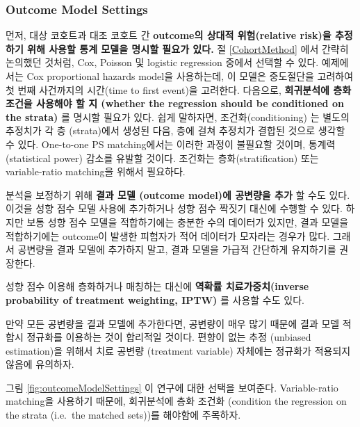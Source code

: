 \documentclass[11pt]{book}
\theoremstyle{definition}
\theoremstyle{definition}
\theoremstyle{definition}
\theoremstyle{remark}
\begin{document}
\subsubsection*{Outcome Model Settings}\label{outcome-model-settings}

먼저, 대상 코호트과 대조 코호트 간 \textbf{outcome의 상대적
위험(relative risk)을 추정하기 위해 사용할 통계 모델을 명시할 필요가
있다.} 절 \ref{CohortMethod} 에서 간략히 논의했던 것처럼, Cox, Poisson
및 logistic regression 중에서 선택할 수 있다. 예제에서는 Cox
proportional hazards model을 사용하는데, 이 모델은 중도절단을 고려하여
첫 번째 사건까지의 시간(time to first event)을 고려한다. 다음으로,
\textbf{회귀분석에 층화 조건을 사용해야 할 지 (whether the regression
should be conditioned on the strata)} 를 명시할 필요가 있다. 쉽게
말하자면, 조건화(conditioning) 는 별도의 추정치가 각 층 (strata)에서
생성된 다음, 층에 걸쳐 추정치가 결합된 것으로 생각할 수 있다. One-to-one
PS matching에서는 이러한 과정이 불필요할 것이며, 통계력 (statistical
power) 감소를 유발할 것이다. 조건화는 층화(stratification) 또는
variable-ratio matching을 위해서 필요하다. 

분석을 보정하기 위해 \textbf{결과 모델 (outcome model)에 공변량을 추가}
할 수도 있다. 이것을 성향 점수 모델 사용에 추가하거나 성향 점수 짝짓기
대신에 수행할 수 있다. 하지만 보통 성향 점수 모델을 적합하기에는 충분한
수의 데이터가 있지만, 결과 모델을 적합하기에는 outcome이 발생한 피험자가
적어 데이터가 모자라는 경우가 많다. 그래서 공변량을 결과 모델에 추가하지
말고, 결과 모델을 가급적 간단하게 유지하기를 권장한다.

성향 점수 이용해 층화하거나 매칭하는 대신에 \textbf{역확률
치료가중치(inverse probability of treatment weighting, IPTW)} 를 사용할
수도 있다.

만약 모든 공변량을 결과 모델에 추가한다면, 공변량이 매우 많기 때문에
결과 모델 적합시 정규화를 이용하는 것이 합리적일 것이다. 편향이 없는
추정 (unbiased estimation)을 위해서 치료 공변량 (treatment variable)
자체에는 정규화가 적용되지 않음에 유의하자.

그림 \ref{fig:outcomeModelSettings} 이 연구에 대한 선택을 보여준다.
Variable-ratio matching을 사용하기 때문에, 회귀분석에 층화 조건화
(condition the regression on the strata (i.e.~the matched sets))를
해야함에 주목하자.
\end{document}
